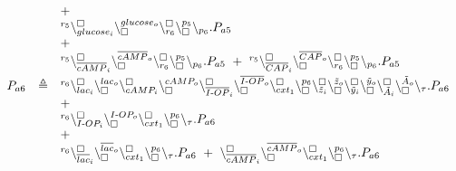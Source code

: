 {\[\begin{array}{lcl}
&& +\\
&& {}^{r_5}\backslash_{glucose_i}^{\scriptstyle {\square}}\backslash_{\scriptstyle {\square}}^{glucose_o} \backslash_{r_6}^{\scriptstyle {\square}}\backslash_{\scriptstyle {\square}}^{p_5}\backslash_{p_6}.P_{a5}\\
&& + \\
&&  {}^{r_5}\backslash_{\overline{cAMP}_i}^{\scriptstyle {\square}}\backslash_{\scriptstyle {\square}}^{\overline{cAMP}_o} \backslash_{r_6}^{\scriptstyle {\square}}\backslash_{\scriptstyle {\square}}^{p_5}\backslash_{p_6}.P_{a5} \ + \ {}^{r_5}\backslash_{\overline{CAP}_i}^{\scriptstyle {\square}}\backslash_{\scriptstyle {\square}}^{\overline{CAP}_o} \backslash_{r_6}^{\scriptstyle {\square}}\backslash_{\scriptstyle {\square}}^{p_5}\backslash_{p_6}.P_{a5}\\[5pt]
P_{a6} & \triangleq& {}^{r_{6}}\backslash_{lac_i}^{\scriptstyle {\square}}\backslash_{\scriptstyle {\square}}^{lac_o}
\backslash_{cAMP_i}^{\scriptstyle {\square}}\backslash_{\scriptstyle {\square}}^{cAMP_o}\backslash_{\overline{I\textrm{-}OP}_i}^{\scriptstyle {\square}}
\backslash_{\scriptstyle {\square}}^{\overline{I\textrm{-}OP}_o}\backslash_{cxt_1}^{\scriptstyle {\square}}
\backslash_{\scriptstyle {\square}}^{p_6}
\backslash_{\tilde{z}_i}^{\scriptstyle {\square}}\backslash_{\scriptstyle {\square}}^{\tilde{z}_o}
\backslash_{\tilde{y}_i}^{\scriptstyle {\square}}\backslash_{\scriptstyle {\square}}^{\tilde{y}_o}
\backslash_{\tilde{A}_i}^{\scriptstyle {\square}}\backslash_{\scriptstyle {\square}}^{\tilde{A}_o}
\backslash_{\tau}.P_{a6}\\
&& +\\
&& {}^{r_{6}}\backslash_{I\textrm{-}OP_i}^{\scriptstyle {\square}}\backslash_{\scriptstyle {\square}}^{I\textrm{-}OP_o} \backslash_{cxt_1}^{\scriptstyle {\square}}\backslash_{\scriptstyle {\square}}^{p_6}\backslash_{\tau}.P_{a6} \\
&& + \\
&&  {}^{r_{6}}\backslash_{\overline{lac}_i}^{\scriptstyle {\square}}\backslash_{\scriptstyle {\square}}^{\overline{lac}_o} \backslash_{cxt_1}^{\scriptstyle {\square}}\backslash_{\scriptstyle {\square}}^{p_6}\backslash_{\tau}.P_{a6} \ + \ \backslash_{\overline{cAMP}_i}^{\scriptstyle {\square}}\backslash_{\scriptstyle {\square}}^{\overline{cAMP}_o} \backslash_{cxt_1}^{\scriptstyle {\square}}\backslash_{\scriptstyle {\square}}^{p_6}\backslash_{\tau}.P_{a6}
\end{array}
\]
}
